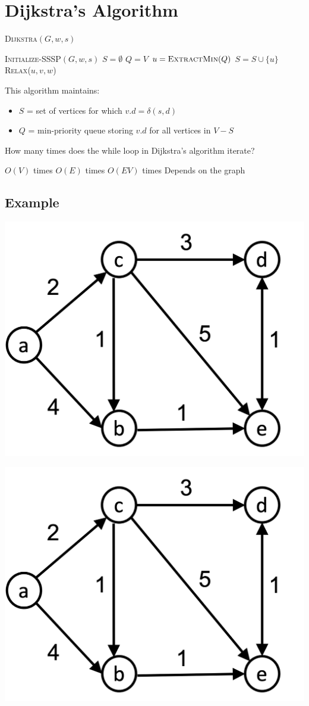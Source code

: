 \documentclass[11  pt]{exam}
\begin{document}
		\section{Dijkstra's Algorithm}
	\begin{algorithm}
		\textsc{Dijkstra}$(G,w,s)$
		\begin{algorithmic}
			\State \textsc{Initialize-SSSP}$(G,w,s)$
			\State $S = \emptyset$
			\State $Q = V$
			\State $u = \textsc{ExtractMin}(Q)$
			\State $S = S \cup \{u\}$
			\State \textsc{Relax}($u,v,w$)
			\EndFor
			\EndWhile
		\end{algorithmic}
	\end{algorithm}
	
	This algorithm maintains:
	\begin{itemize}
		\item $S$ = set of vertices for which $v.d = \delta(s,d)$
		\item $Q$ = min-priority queue storing $v.d$ for all vertices in $V-S$ 
	\end{itemize}
	\vs{2cm}
	\begin{Qu}
		How many times does the while loop in Dijkstra's algorithm iterate?
		\begin{itemize}
			\aitem $O(V)$ times
			\bitem $O(E)$ times
			\citem $O(EV)$ times
			\ditem Depends on the graph
		\end{itemize}
	\end{Qu}
	
	
	\newpage
	
	\subsection{Example}
	\includegraphics[width = .45\linewidth]{small-graph-sssp.png}
	
	\includegraphics[width = .45\linewidth]{small-graph-sssp.png}
	
\end{document}
